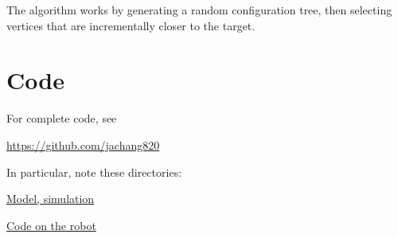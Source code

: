 \documentclass[11pt]{article}
\begin{document}
The algorithm works by generating a random configuration tree, then selecting vertices that are incrementally closer to the target.

\section{Code}

For complete code, see

	\href{https://github.com/jachang820}{https://github.com/jachang820}
	
In particular, note these directories:

	\href{https://github.com/jachang820/Mobile-Robot-Simulator/tree/master/mysite/simulation/static/js}{Model, simulation}
	
	\href{https://github.com/jachang820/Mobile-Robot-Simulator/tree/master/arduino}{Code on the robot}
\end{document}
